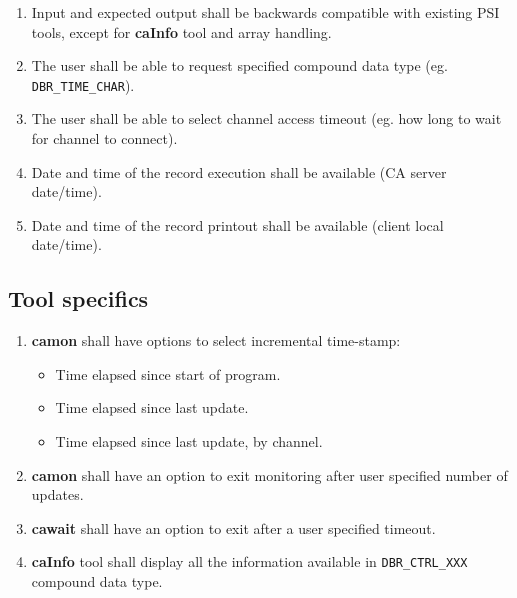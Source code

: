 \documentclass[12pt,a4paper]{article}
\begin{document}
\begin{enumerate}
	\item Input and expected output shall be backwards compatible with existing PSI tools, except for \textbf{caInfo} tool and array handling.
	\item The user shall be able to request specified compound data type (eg. \texttt{DBR\_TIME\_CHAR}).
	\item The user shall be able to select channel access timeout (eg. how long to wait for channel to connect).
	\item Date and time of the record execution shall be available (CA server date/time).
	\item Date and time of the record printout shall be available (client local date/time).
\end{enumerate}

\subsection{Tool specifics}
\begin{enumerate}
	\item \textbf{camon} shall have options to select incremental time-stamp:
	\begin{itemize}
		\item Time elapsed since start of program.
		\item Time elapsed since last update.
		\item Time elapsed since last update, by channel.
	\end{itemize}
	\item \textbf{camon} shall have an option to exit monitoring after user specified number of updates.
	\item \textbf{cawait} shall have an option to exit after a user specified timeout.
	\item \textbf{caInfo} tool shall display all the information available in \texttt{DBR\_CTRL\_XXX} compound data type.
\end{enumerate}
\end{document}
